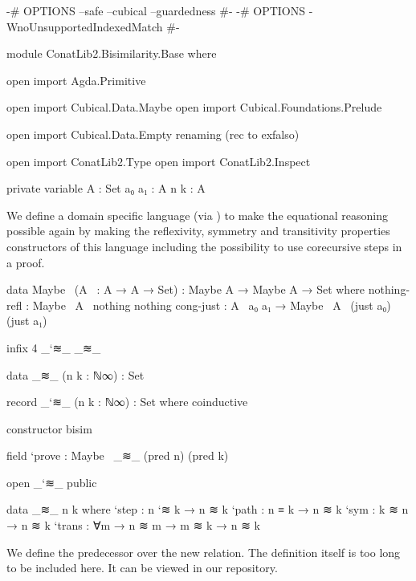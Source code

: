 \begin{code}[hide]
{-# OPTIONS --safe --cubical --guardedness #-}
{-# OPTIONS -WnoUnsupportedIndexedMatch #-}

module ConatLib2.Bisimilarity.Base where

open import Agda.Primitive

open import Cubical.Data.Maybe
open import Cubical.Foundations.Prelude

open import Cubical.Data.Empty
  renaming (rec to exfalso)

open import ConatLib2.Type
open import ConatLib2.Inspect

private variable
  A : Set
  a₀ a₁ : A
  n k : A
\end{code}

We define a domain specific language (via \cite{danielsson-beating}) to make
the equational reasoning possible again by making the reflexivity, symmetry and
transitivity properties constructors of this language including the possibility
to use corecursive steps in a proof.

\begin{code}
data Maybe~ (A~ : A → A → Set) :
  Maybe A → Maybe A → Set
  where
    nothing-refl : Maybe~ A~ nothing nothing
    cong-just : A~ a₀ a₁ → Maybe~ A~ (just a₀) (just a₁)
\end{code}
\begin{code}[hide]
infix 4 _`≋_ _≋_
\end{code}
\begin{code}
data _≋_ (n k : ℕ∞) : Set

record _`≋_ (n k : ℕ∞) : Set where
  coinductive
\end{code}
\begin{code}[hide]
  constructor bisim
\end{code}
\begin{code}
  field
    `prove : Maybe~ _≋_ (pred n) (pred k)
\end{code}
\begin{code}[hide]
open _`≋_ public
\end{code}
\begin{code}
data _≋_ n k where
  `step  : n `≋ k → n ≋ k
  `path  : n ≡ k → n ≋ k
  `sym   : k ≋ n → n ≋ k
  `trans : ∀{m} → n ≋ m → m ≋ k → n ≋ k
\end{code}

We define the predecessor over the new  relation.
The definition itself is too long to be included here. It can be viewed
in our repository.

